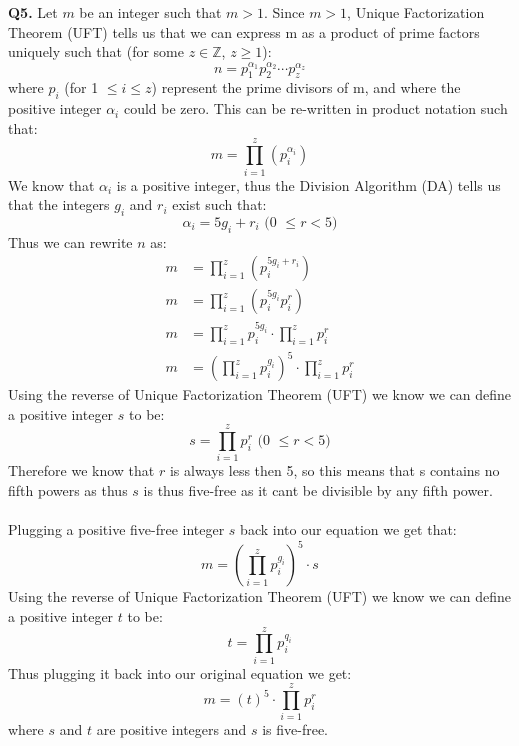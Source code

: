 \documentclass[11pt]{article}
\begin{document}
\parindent=0pt

\textbf{Q5.} Let $m$ be an integer such that $m > 1$. Since $m >1$, Unique Factorization Theorem (UFT) tells us that we can express m as a product of prime factors uniquely such that (for some $z \in \mathbb{Z}$, $z \geq 1$):
\[ n = p_1^{\alpha_1}p_2^{\alpha_2}\cdots p_z^{\alpha_z}  \]
where $p_i$ (for 1 $\leq i \leq z$) represent the prime divisors of m, and where the positive integer $\alpha_i$ could be zero. This can be re-written in product notation such that:
\[ m  = \prod_{i=1}^z(p_i^{\alpha_i}) \]
We know that $\alpha_i$ is a positive integer, thus the Division Algorithm (DA) tells us that the integers $g_i$ and $r_i$ exist such that:
\[ \alpha_i = 5g_i + r_i \text { (0 $\leq r < 5$)}\]
Thus we can rewrite $n$ as:
\begin{align*}
m  &= \prod_{i=1}^z(p_i^{5g_i + r_i}) \\
m  &= \prod_{i=1}^z(p_i^{5g_i}p^r_i)\\
m  &= \prod_{i=1}^zp_i^{5g_i} \cdot \prod_{i=1}^zp^r_i\\
m  &= (\prod_{i=1}^zp_i^{g_i})^5 \cdot \prod_{i=1}^zp^r_i
\end{align*}
Using the reverse of Unique Factorization Theorem (UFT) we know we can define a positive integer $s$ to be:
\[ s = \prod_{i=1}^zp^r_i  \text { (0 $\leq r < 5$)}\]
Therefore we know that $r$ is always less then 5, so this means that s contains no fifth powers as thus $s$ is thus five-free as it cant be divisible by any fifth power.\\\\
Plugging a positive five-free integer $s$ back into our equation we get that:
\[ m  = (\prod_{i=1}^zp_i^{g_i})^5 \cdot s\]
Using the reverse of Unique Factorization Theorem (UFT) we know we can define a positive integer $t$ to be:
\[ t = \prod_{i=1}^zp_i^{q_i}  \]
Thus plugging it back into our original equation we get:
\[ m  = (t)^5 \cdot \prod_{i=1}^zp^r_i \]
where $s$ and $t$ are positive integers and $s$ is five-free.
\end{document}
